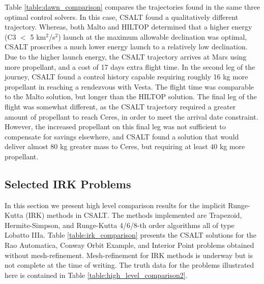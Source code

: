\documentclass[ISTS  ]{tjsass} %
\begin{document}
Table \ref{table:dawn_comparison} compares the trajectories found in the same three optimal control solvers. In this case, CSALT found a qualitatively different trajectory. Whereas, both Malto and HILTOP determined that a higher energy (C3 $<$ 5 km$^2$/s$^2$) launch at the maximum allowable declination was optimal, CSALT proscribes a much lower energy launch to a relatively low declination. Due to the higher launch energy, the CSALT trajectory arrives at Mars using more propellant, and a cost of 17 days extra flight time. In the second leg of the journey, CSALT found a control history capable requiring roughly 16 kg more propellant in reaching a rendezvous with Vesta. The flight time was comparable to the Malto solution, but longer than the HILTOP solution. The final leg of the flight was somewhat different, as the CSALT trajectory required a greater amount of propellant to reach Ceres, in order to meet the arrival date constraint. However, the increased propellant on this final leg was not sufficient to compensate for savings elsewhere, and CSALT found a solution that would deliver almost 80 kg greater mass to Ceres, but requiring at least 40 kg more propellant.

\subsection{Selected IRK Problems}

In this section we present high level comparison results for the implicit Runge-Kutta (IRK) methods in CSALT.  The methods implemented are Trapezoid, Hermite-Simpson, and Runge-Kutta 4/6/8-th order algorithms all of type Lobatto IIIa. Table \ref{table:irk_comparison} presents the CSALT solutions for the Rao Automatica, Conway Orbit Example, and Interior Point problems obtained without mesh-refinement.  Mesh-refinement for IRK methods is underway but is not complete at the time of writing. The truth data for the problems illustrated here is contained in Table \ref{table:high_level_comparison2}.
\end{document}

